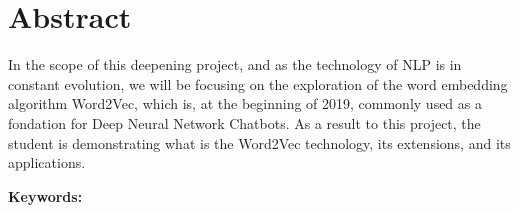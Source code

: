 \chapter*{Abstract}

In the scope of this deepening project, and as the technology of NLP is in constant evolution, we will be focusing on the exploration of the word embedding algorithm Word2Vec, which is, at the beginning of 2019, commonly used as a fondation for Deep Neural Network Chatbots. As a result to this project, the student is demonstrating what is the Word2Vec technology, its extensions, and its applications.

\vskip0.5cm
\textbf{Keywords:} 
\Keywords